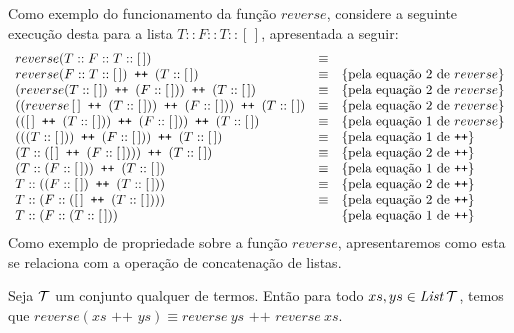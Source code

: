 Como exemplo do funcionamento da função $reverse$, considere a
seguinte execução desta para a lista $T :: F :: T :: [\,]$, apresentada a
seguir:
\[
\begin{array}{lcl}
reverse(T :: F :: T :: [\,]) & \equiv \\
reverse(F :: T :: [\,]) \texttt{ ++ } (T :: [\,]) & \equiv &
\{\text{pela equação 2 de }reverse\} \\
(reverse(T :: [\,]) \texttt{ ++ } (F :: [\,])) \texttt{ ++ } (T :: [\,]) & \equiv &
\{\text{pela equação 2 de }reverse\} \\
((reverse\, [\,] \texttt{ ++ } (T :: [\,])) \texttt{ ++ } (F :: [\,])) \texttt{ ++ } (T :: [\,]) & \equiv &
\{\text{pela equação 2 de }reverse\} \\
(([\,] \texttt{ ++ } (T :: [\,])) \texttt{ ++ } (F :: [\,])) \texttt{ ++ } (T :: [\,]) & \equiv &
\{\text{pela equação 1 de }reverse\} \\
(((T :: [\,])) \texttt{ ++ } (F :: [\,])) \texttt{ ++ } (T :: [\,]) & \equiv &
\{\text{pela equação 1 de \texttt{++}}\} \\
(T :: ([\,] \texttt{ ++ } (F :: [\,]))) \texttt{ ++ } (T :: [\,]) & \equiv &
\{\text{pela equação 2 de \texttt{++}}\} \\
(T :: (F :: [\,])) \texttt{ ++ } (T :: [\,]) & \equiv &
\{\text{pela equação 1 de \texttt{++}}\} \\
T :: ((F :: [\,]) \texttt{ ++ } (T :: [\, ])) & \equiv & \{\text{pela
   equação 2 de \texttt{++}}\}\\
T :: (F :: ([\,] \texttt{ ++ } (T :: [\, ]))) & \equiv & \{\text{pela
  equação 2 de \texttt{++}}\}\\
T :: (F :: (T :: [\, ])) &  & \{\text{pela
  equação 1 de \texttt{++}}\}
\end{array}
\]
Como exemplo de propriedade sobre a função $reverse$, apresentaremos
como esta se relaciona com a operação de concatenação de listas.
\begin{Theorem}
Seja $\mathcal{T}$ um conjunto qualquer de termos. Então para todo
$xs,ys\in\textit{List\/}\,\mathcal{T}$, temos que $reverse(xs \texttt{ ++ } ys)
\equiv reverse\: ys \texttt{ ++ } reverse\: xs$.
\end{Theorem}
